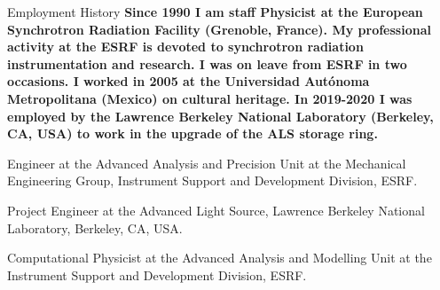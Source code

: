 \begin{rubric}{Employment History}
\entry*[]%
\textbf{Since 1990 I am staff Physicist at the European Synchrotron Radiation Facility (Grenoble, France). My professional activity at the ESRF is devoted to synchrotron radiation instrumentation and research.  I was on leave from ESRF in two occasions. I worked in 2005 at the Universidad Aut\'onoma Metropolitana (Mexico) on cultural heritage. In 2019-2020 I was employed by the Lawrence Berkeley National Laboratory (Berkeley, CA, USA) to work in the upgrade of the ALS storage ring.}

% 
Engineer at the Advanced Analysis and Precision Unit at the Mechanical Engineering Group, Instrument Support and Development Division, ESRF.   

\entry*[2019/7/15 –- 2020/6/14]
Project Engineer at the Advanced Light Source, Lawrence Berkeley National Laboratory, Berkeley, CA, USA. 

\entry*[2009 –- 2019]  Computational Physicist at the Advanced Analysis and Modelling Unit at the Instrument Support and Development Division, ESRF. 



\end{rubric}
